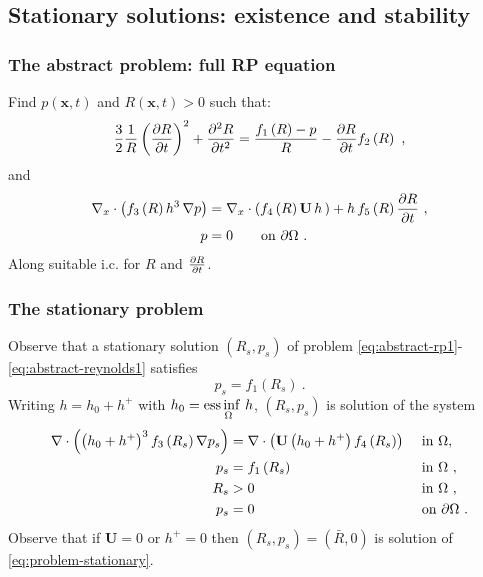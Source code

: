 \documentclass[10pt,aspectratio=169]{beamer}
\newenvironment{nalign}{
	\begin{equation}
	\begin{aligned}
}{
	\end{aligned}
	\end{equation}
	\ignorespacesafterend
}
\begin{document}

\subsection{Stationary solutions: existence and stability}
\setcounter{showSlideNumbers}{0}
\begin{frame}[noframenumbering]
\tableofcontents[
currentsection,
currentsubsection,
subsectionstyle=show/shaded/hide
]
\end{frame}
\setcounter{showSlideNumbers}{1}


\begin{frame}
\frametitle{The abstract problem: full RP equation}
Find $p(\mathbf{x},t)$ and $R(\mathbf{x},t)>0$ such that:
\begin{equation*}
\frac{3}{2}\frac{1}{R}\left(\frac{\partial R}{\partial t}\right)^2+\frac{\partial^2 R}{\partial t^2}=\frac{f_1\left(R\right)-p}{R}-\frac{\partial R}{\partial t}f_2\left(R\right)~,
\end{equation*}
and
\begin{align*}
\begin{split}
\nabla_x\cdot \left(f_3\left(R\right) h^3\,\nabla p\right)&=\nabla_x\cdot \left(f_4\left(R\right)\mathbf{U}\,h\,\right)+h\,f_5\left(R\right)\frac{\partial R}{\partial t}~,\\
p&=0 \qquad\mbox{on } \partial \Omega~.
\end{split}
\end{align*}
Along suitable i.c. for $R$ and $\frac{\partial R}{\partial t}$.
\end{frame} 


\begin{frame}
\frametitle{The stationary problem}

Observe that a stationary solution $(R_s,p_s)$ of problem \eqref{eq:abstract-rp1}-\eqref{eq:abstract-reynolds1} satisfies
\begin{equation*}
p_s=f_1\left(R_s\right)~.
\end{equation*}
Writing $h=h_0+h^+$ with $h_0=\underset{\Omega}{\operatorname*{ess\,inf}{\,h}}$, $(R_s,p_s)$ is solution of the system
\begin{nalign}
	\nabla\cdot \left(\left(h_0+h^+\right)^3f_3\left(R_s\right)\nabla p_s\right)&=\nabla\cdot\left(\mathbf{U}\left(h_0+h^+\right)f_4\left(R_s\right)\right)&&\textnormal{ in } \Omega,\\
	p_s&=f_1\left(R_s\right)&&\textnormal{ in } \Omega~,\\
	R_s&>0&&\textnormal{ in } \Omega~,\\
	p_s&=0&&\textnormal{ on }\partial \Omega~.
	\label{eq:problem-stationary}
\end{nalign}
Observe that if $\mathbf{U}=0$ or $h^+=0$ then $\left(R_s,p_s\right)=\left(\bar{R},0\right)$ is solution of \eqref{eq:problem-stationary}.


\end{frame} 
\end{document}
